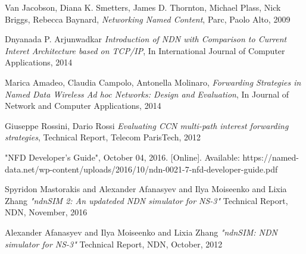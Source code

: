 

\begin{thebibliography}{99}

  Van Jacobson, Diana K. Smetters, James D. Thornton, Michael Plass, Nick Briggs, Rebecca Baynard,
  \textit{Networking Named Content},
  Parc, Paolo Alto, 2009
  
  Dnyanada P. Arjunwadkar
  \textit{Introduction of NDN with Comparison to Current Interet Architecture based on TCP/IP},
  In International Journal of Computer Applications, 2014

  Marica Amadeo, Claudia Campolo, Antonella Molinaro,
  \textit{Forwarding Strategies in Named Data Wireless Ad hoc Networks: Design and Evaluation},
  In Journal of Network and Computer Applications, 2014
  
  Giuseppe Rossini, Dario Rossi
  \textit{Evaluating CCN multi-path interest forwarding strategies},
  Technical Report, Telecom ParisTech, 2012
  
  "NFD Developer's Guide", October 04, 2016. [Online]. Available: {https://named-data.net/wp-content/uploads/2016/10/ndn-0021-7-nfd-developer-guide.pdf}

  Spyridon Mastorakis and Alexander Afanasyev and Ilya Moiseenko and Lixia Zhang
  \textit{"ndnSIM 2: An updateded NDN simulator for NS-3"}
  Technical Report, NDN, November, 2016


  Alexander Afanasyev and Ilya Moiseenko and Lixia Zhang
  \textit{"ndnSIM: NDN simulator for NS-3"}
  Technical Report, NDN, October, 2012



\end{thebibliography}
